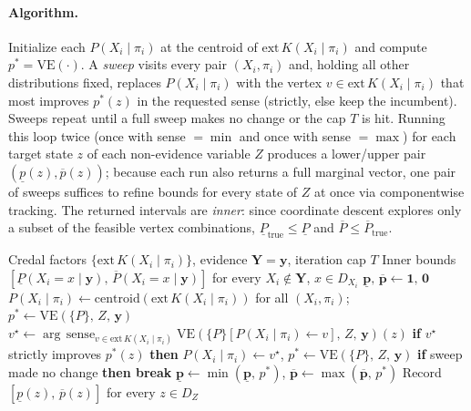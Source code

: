 \documentclass[11pt]{article}
\begin{document}
\paragraph{Algorithm.}
Initialize each $P(X_i \mid \pi_i)$ at the centroid of
$\mathrm{ext}\,K(X_i \mid \pi_i)$ and compute $p^* = \mathrm{VE}(\cdot)$. A
\emph{sweep} visits every pair $(X_i, \pi_i)$ and, holding all other
distributions fixed, replaces $P(X_i \mid \pi_i)$ with the vertex
$v \in \mathrm{ext}\,K(X_i \mid \pi_i)$ that most improves $p^*(z)$ in the
requested sense (strictly, else keep the incumbent). Sweeps repeat until a
full sweep makes no change or the cap $T$ is hit. Running this loop twice
(once with sense $= \min$ and once with sense $= \max$) for each target
state $z$ of each non-evidence variable $Z$ produces a lower/upper pair
$(\underline{p}(z), \overline{p}(z))$; because each run also returns a full
marginal vector, one pair of sweeps suffices to refine bounds for every
state of $Z$ at once via componentwise tracking. The returned intervals
are \emph{inner}: since coordinate descent explores only a subset of the
feasible vertex combinations, $\underline{P}_{\mathrm{true}} \le \underline{P}$
and $\overline{P} \le \overline{P}_{\mathrm{true}}$.

\begin{algorithm}[H]
\caption{ApproxLP --- Compact Form}
\label{alg:approxlp-compact}
\begin{algorithmic}[1]
\Require Credal factors $\{\mathrm{ext}\,K(X_i \mid \pi_i)\}$,
         evidence $\mathbf{Y} = \mathbf{y}$, iteration cap $T$
\Ensure Inner bounds
        $[\underline{P}(X_i{=}x \mid \mathbf{y}),\, \overline{P}(X_i{=}x \mid \mathbf{y})]$
        for every $X_i \notin \mathbf{Y}$, $x \in D_{X_i}$
  \State $\underline{\mathbf{p}},\, \overline{\mathbf{p}} \gets \mathbf{1},\, \mathbf{0}$
    \State $P(X_i \mid \pi_i) \gets \mathrm{centroid}(\mathrm{ext}\,K(X_i \mid \pi_i))$
           for all $(X_i, \pi_i)$;\quad
           $p^* \gets \mathrm{VE}(\{P\},\, Z,\, \mathbf{y})$
        \State $v^\star \gets \arg\,\mathrm{sense}_{v \in \mathrm{ext}\,K(X_i \mid \pi_i)}\;
               \mathrm{VE}(\{P\}[P(X_i \mid \pi_i){\gets}v],\, Z,\, \mathbf{y})(z)$
        \Statex \hspace{3em}
        \State \textbf{if} $v^\star$ strictly improves $p^*(z)$
               \textbf{then} $P(X_i \mid \pi_i) \gets v^\star$,\;
               $p^* \gets \mathrm{VE}(\{P\},\, Z,\, \mathbf{y})$
      \EndFor
      \State \textbf{if} sweep made no change \textbf{then break}
    \EndFor
    \State $\underline{\mathbf{p}} \gets \min(\underline{\mathbf{p}},\, p^*)$,\quad
           $\overline{\mathbf{p}} \gets \max(\overline{\mathbf{p}},\, p^*)$
  \EndFor
  \State Record $[\underline{p}(z),\, \overline{p}(z)]$ for every $z \in D_Z$
\EndFor
\end{algorithmic}
\end{algorithm}
\end{document}
